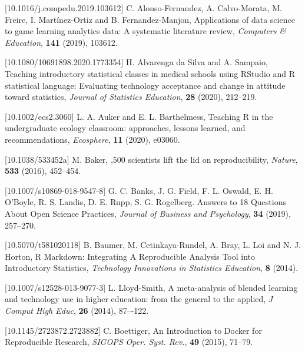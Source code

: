 \documentclass{aims}
\theoremstyle{definition}
\begin{document}
\begin{thebibliography}{99}

 [10.1016/j.compedu.2019.103612]
     \newblock  C. Alonso-Fernandez,  A. Calvo-Morata, M. Freire, I. Martínez-Ortiz and B. Fernandez-Manjon,
     \newblock Applications of data science to game learning analytics data: A systematic literature review,
     \newblock \emph{Computers \& Education}, \textbf{141} (2019), 103612.

 [10.1080/10691898.2020.1773354]
     \newblock  H. Alvarenga da Silva and A. Sampaio,
     \newblock Teaching introductory statistical classes in medical schools using RStudio and R statistical language: Evaluating technology acceptance and change in attitude toward statistics,
     \newblock \emph{Journal of Statistics Education}, \textbf{28} (2020), 212--219.

 [10.1002/ecs2.3060]
     \newblock  L. A. Auker and E. L. Barthelmess,
     \newblock Teaching R in the undergraduate ecology classroom: approaches, lessons learned, and recommendations,
     \newblock \emph{Ecosphere}, \textbf{11} (2020), e03060.

 [10.1038/533452a]
     \newblock  M. Baker,
     ,500 scientists lift the lid on reproducibility,
     \newblock \emph{Nature}, \textbf{533} (2016), 452--454.

 [10.1007/s10869-018-9547-8]
     \newblock  G. C. Banks, J. G. Field, F. L. Oswald, E. H. O'Boyle, R. S. Landis, D. E. Rupp, S. G. Rogelberg.
     \newblock Answers to 18 Questions About Open Science Practices,
     \newblock \emph{Journal of Business and Psychology}, \textbf{34} (2019), 257--270.

 [10.5070/t581020118]
     \newblock B. Baumer, M. Cetinkaya-Rundel, A. Bray, L. Loi and N. J. Horton,
     \newblock R Markdown: Integrating A Reproducible Analysis Tool into Introductory Statistics,
     \newblock \emph{Technology Innovations in Statistics Education}, \textbf{8} (2014).

 [10.1007/s12528-013-9077-3]
     \newblock  L. Lloyd-Smith,
     \newblock A meta-analysis of blended learning and technology use in higher education: from the general to the applied,
     \newblock \emph{J Comput High Educ}, \textbf{26} (2014), 87–-122.

 [10.1145/2723872.2723882]
     \newblock  C. Boettiger,
     \newblock An Introduction to Docker for Reproducible Research,
     \newblock \emph{SIGOPS Oper. Syst. Rev.}, \textbf{49} (2015), 71--79.


\end{thebibliography}
\end{document}
